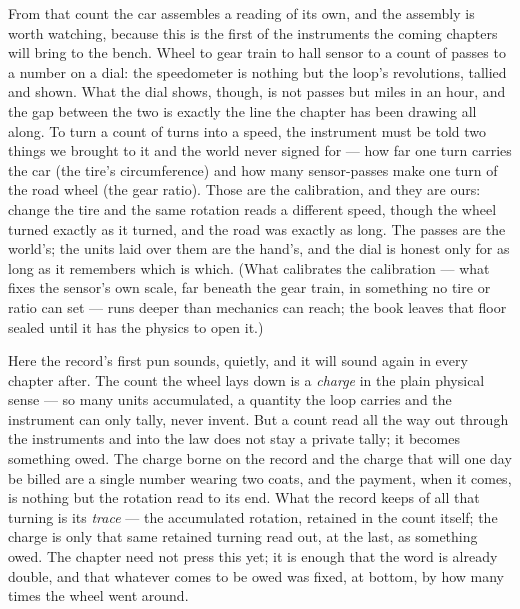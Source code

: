 From that count the car assembles a reading of its own, and the assembly is worth watching, because this is the
first of the instruments the coming chapters will bring to the bench. Wheel to gear train to hall sensor to a
count of passes to a number on a dial: the speedometer is nothing but the loop's revolutions, tallied and
shown. What the dial shows, though, is not passes but miles in an hour, and the gap between the two is exactly
the line the chapter has been drawing all along. To turn a count of turns into a speed, the instrument must be
told two things we brought to it and the world never signed for --- how far one turn carries the car (the
tire's circumference) and how many sensor-passes make one turn of the road wheel (the gear ratio). Those are
the calibration, and they are ours: change the tire and the same rotation reads a different speed, though the
wheel turned exactly as it turned, and the road was exactly as long. The passes are the world's; the units laid
over them are the hand's, and the dial is honest only for as long as it remembers which is which. (What
calibrates the calibration --- what fixes the sensor's own scale, far beneath the gear train, in something no
tire or ratio can set --- runs deeper than mechanics can reach; the book leaves that floor sealed until it has
the physics to open it.)

Here the record's first pun sounds, quietly, and it will sound again in every chapter after. The count the
wheel lays down is a \emph{charge} in the plain physical sense --- so many units accumulated, a quantity the
loop carries and the instrument can only tally, never invent. But a count read all the way out through the
instruments and into the law does not stay a private tally; it becomes something owed. The charge borne on the
record and the charge that will one day be billed are a single number wearing two coats, and the payment, when
it comes, is nothing but the rotation read to its end. What the record keeps of all that turning is its
\emph{trace} --- the accumulated rotation, retained in the count itself; the charge is only that same retained
turning read out, at the last, as something owed. The chapter need not press this yet; it is enough that
the word is already double, and that whatever comes to be owed was fixed, at bottom, by how many times the wheel
went around.

